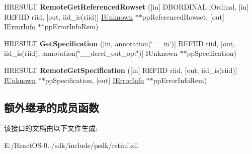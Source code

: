 \begin{DoxyCompactItemize}
H\+R\+E\+S\+U\+LT {\bfseries Remote\+Get\+Referenced\+Rowset} (\mbox{[}in\mbox{]} D\+B\+O\+R\+D\+I\+N\+AL i\+Ordinal, \mbox{[}in\mbox{]} R\+E\+F\+I\+ID riid, \mbox{[}out, iid\+\_\+is(riid)\mbox{]} \hyperlink{interface_i_unknown}{I\+Unknown} $\ast$$\ast$pp\+Referenced\+Rowset, \mbox{[}out\mbox{]} \hyperlink{interface_i_error_info}{I\+Error\+Info} $\ast$$\ast$pp\+Error\+Info\+Rem)
\item 
\mbox{\label{interface_i_rowset_info_a98dc6d38ff915fa078fea4ca89a0a38d}} 
H\+R\+E\+S\+U\+LT {\bfseries Get\+Specification} (\mbox{[}in, annotation(\char`\"{}\+\_\+\+\_\+in\char`\"{})\mbox{]} R\+E\+F\+I\+ID riid, \mbox{[}out, iid\+\_\+is(riid), annotation(\char`\"{}\+\_\+\+\_\+deref\+\_\+out\+\_\+opt\char`\"{})\mbox{]} I\+Unknown $\ast$$\ast$pp\+Specification)
\item 
\mbox{\label{interface_i_rowset_info_af5c6c4410e01714458e32e6994ffb3d5}} 
H\+R\+E\+S\+U\+LT {\bfseries Remote\+Get\+Specification} (\mbox{[}in\mbox{]} R\+E\+F\+I\+ID riid, \mbox{[}out, iid\+\_\+is(riid)\mbox{]} \hyperlink{interface_i_unknown}{I\+Unknown} $\ast$$\ast$pp\+Specification, \mbox{[}out\mbox{]} \hyperlink{interface_i_error_info}{I\+Error\+Info} $\ast$$\ast$pp\+Error\+Info\+Rem)
\end{DoxyCompactItemize}
\subsection*{额外继承的成员函数}


该接口的文档由以下文件生成\+:\begin{DoxyCompactItemize}
\item 
E\+:/\+React\+O\+S-\/0../sdk/include/psdk/rstinf.\+idl\end{DoxyCompactItemize}
